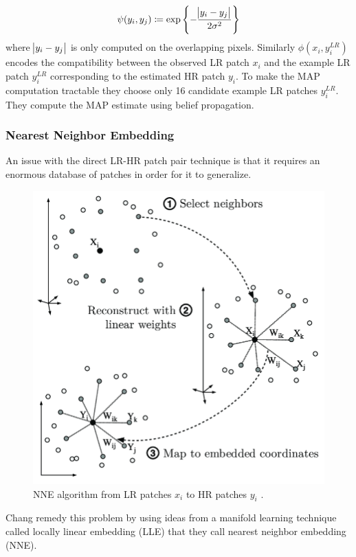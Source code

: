\begin{equation}
    \psi(y_i, y_j) \coloneqq \exp \left\{ -  \frac{\abs{ y_i - y_j }}{2\sigma^2} \right\}
\end{equation}
where \(\abs{ y_i - y_j }\) is only computed on the overlapping pixels.
%
Similarly \(\phi(x_i, y_i^{LR})\) encodes the compatibility between the observed LR patch \(x_i\) and the example LR patch \(y_i^{LR}\) corresponding to the estimated HR patch \(y_i\).
%
To make the MAP computation tractable they choose only 16 candidate example LR patches \(y_i^{LR}\).
%
They compute the MAP estimate using belief propagation.

\subsubsection{Nearest Neighbor Embedding}
An issue with the direct LR-HR patch pair technique is that it requires an enormous database of patches in order for it to generalize.
%
\begin{figure}
    \centering
    \includegraphics[width=\linewidth,keepaspectratio]{figures/classical/lle.png}
    \caption{NNE algorithm from LR patches \(x_i\) to HR patches \(y_i\) \cite{Guillermophdthesis}.}
    \label{fig:lle}
\end{figure}
Chang \etal remedy this problem by using ideas from a manifold learning technique called locally linear embedding \cite{saul2000introduction} (LLE) that they call nearest neighbor embedding (NNE).
